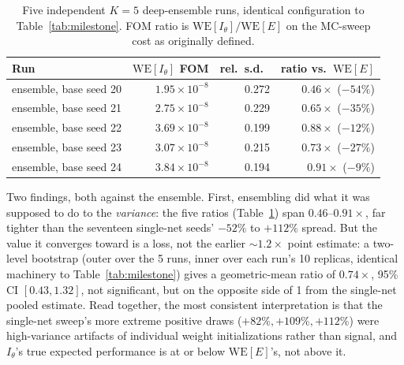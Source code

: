 \documentclass[a4paper,fleqn]{cas-sc}
\begin{document}
\begin{table}[h]
	\centering\small
	\caption{Five independent $K{=}5$ deep-ensemble runs, identical configuration to
		Table~\ref{tab:milestone}. FOM ratio is $\mathrm{WE}[I_\theta]/\mathrm{WE}[E]$ on the
		MC-sweep cost as originally defined.}
	\label{tab:ensemble}
	\begin{tabular}{lrrr}
		\toprule
		Run & $\mathrm{WE}[I_\theta]$ FOM & rel.\ s.d.\ & ratio vs.\ $\mathrm{WE}[E]$ \\
		\midrule
		ensemble, base seed 20 & $1.95\times10^{-8}$ & 0.272 & $0.46\times$ ($-54\%$) \\
		ensemble, base seed 21 & $2.75\times10^{-8}$ & 0.229 & $0.65\times$ ($-35\%$) \\
		ensemble, base seed 22 & $3.69\times10^{-8}$ & 0.199 & $0.88\times$ ($-12\%$) \\
		ensemble, base seed 23 & $3.07\times10^{-8}$ & 0.215 & $0.73\times$ ($-27\%$) \\
		ensemble, base seed 24 & $3.84\times10^{-8}$ & 0.194 & $0.91\times$ ($-9\%$) \\
		\bottomrule
	\end{tabular}
\end{table}

Two findings, both against the ensemble. First, ensembling did what it was
supposed to do to the \emph{variance}: the five ratios (Table~\ref{tab:ensemble}) span
$0.46$--$0.91\times$, far tighter than the seventeen single-net seeds' $-52\%$ to
$+112\%$ spread. But the value it converges toward is a loss, not the earlier
$\sim\!1.2\times$ point estimate: a two-level bootstrap (outer over the 5 runs, inner over
each run's 10 replicas, identical machinery to Table~\ref{tab:milestone}) gives a
geometric-mean ratio of $0.74\times$, 95\% CI $[0.43, 1.32]$, not significant, but on the
opposite side of 1 from the single-net pooled estimate. Read together, the most consistent
interpretation is that the single-net sweep's more extreme positive draws ($+82\%,
+109\%, +112\%$) were high-variance artifacts of individual weight initializations rather
than signal, and $I_\theta$'s true expected performance is at or below
$\mathrm{WE}[E]$'s, not above it.
\end{document}
